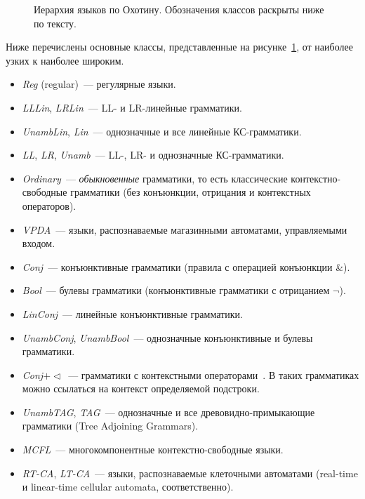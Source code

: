 \begin{figure}[h!]
    \begin{center}
        \resizebox{\textwidth}{!}{
            
        }
    \end{center}
    \caption{Иерархия языков по Охотину. Обозначения классов раскрыты ниже по тексту.}
    \label{fig:hierarchyOkhotin}
\end{figure}

Ниже перечислены основные классы, представленные на рисунке~\ref{fig:hierarchyOkhotin}, от наиболее узких к наиболее широким.
\begin{itemize}
    \item \emph{Reg} (regular)~--- регулярные языки.
    \item \emph{LLLin}, \emph{LRLin}~--- LL- и LR-линейные грамматики.
    \item \emph{UnambLin}, \emph{Lin}~--- однозначные и все линейные КС-грамматики.
    \item \emph{LL}, \emph{LR}, \emph{Unamb}~--- LL-, LR- и однозначные КС-грамматики.
    \item \emph{Ordinary}~--- \emph{обыкновенные} грамматики, то есть классические контекстно-свободные%
     грамматики (без конъюнкции, отрицания и контекстных операторов).
    \item \emph{VPDA}~--- языки, распознаваемые магазинными автоматами, управляемыми входом.
    \item \emph{Conj}~--- конъюнктивные грамматики (правила с операцией конъюнкции \&).
    \item \emph{Bool}~--- булевы грамматики (конъюнктивные грамматики с отрицанием $\neg$).
    \item \emph{LinConj}~--- линейные конъюнктивные грамматики.
    \item \emph{UnambConj}, \emph{UnambBool}~--- однозначные конъюнктивные и булевы грамматики.
    \item \emph{Conj$+\lhd$}~--- грамматики с контекстными операторами~.
          В таких грамматиках можно ссылаться на контекст определяемой подстроки.
    \item \emph{UnambTAG}, \emph{TAG}~--- однозначные и все древовидно-примыкающие грамматики (Tree Adjoining Grammars).
    \item \emph{MCFL}~--- многокомпонентные контекстно-свободные языки.
    \item \emph{RT-CA}, \emph{LT-CA}~--- языки, распознаваемые клеточными автоматами (real-time и linear-time cellular automata, соответственно).
\end{itemize}


